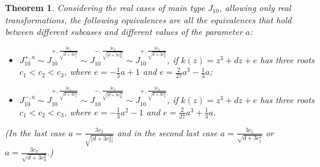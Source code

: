 \documentclass[noend]{amsproc}
\newtheorem{theorem}{Theorem}
\theoremstyle{definition}
\begin{document}
\begin{theorem}
Considering the real cases of main type $J_{10}$, allowing only real transformations, the following equivalences are all the equivalences that hold between different subcases and different values of the parameter $a$:
\begin{itemize}
\item $J_{10}^{+,a}\sim J_{10}^{+,\frac{3c_1}{\sqrt{d+3c_1^2}}}\sim J_{10}^{-,\frac{3c_2}{\sqrt{|d+3c_2^2|}}}\sim J_{10}^{+,\frac{3c_3}{\sqrt{d+3c_3^2}}}$, if $k(z)=z^3+dz+e$ has three roots $c_1<c_2<c_3$, where $e=-\frac{1}{3}a+1$ and $e=\frac{2}{27}a^3-\frac{1}{3}a$;\\
\item $J_{10}^{-,a}\sim J_{10}^{+,\frac{3c_1}{\sqrt{d+3c_1^2}}}\sim J_{10}^{-,\frac{3c_2}{\sqrt{|d+3c_2^2|}}}\sim J_{10}^{+,\frac{3c_3}{\sqrt{d+3c_3^2}}}$, if $k(z)=z^3+dz+e$ has three roots $c_1<c_2<c_3$, where $e=-\frac{1}{3}a^2-1$ and $e=\frac{2}{27}a^3+\frac{1}{3}a$.\\
\end{itemize}
(In the last case $a=\frac{3c_2}{\sqrt{|d+3c_2^2|}}$ and in the second last case $a=\frac{3c_1}{\sqrt{d+3c_1^2}}$ or $a=\frac{3c_3}{\sqrt{d+3c_3^2}}$.)
\end{theorem}
\end{document}

